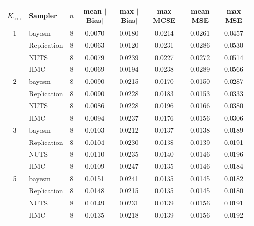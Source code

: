\begin{tabular}{clcccccc}
\toprule
$K_{\text{true}}$ & Sampler & $n$ & mean $|$Bias$|$ & max $|$Bias$|$ & max MCSE & mean MSE & max MSE \\
\midrule
1 & bayesm & 8 & 0.0070 & 0.0180 & 0.0214 & 0.0261 & 0.0457 \\
 & Replication & 8 & 0.0063 & 0.0120 & 0.0231 & 0.0286 & 0.0530 \\
 & NUTS & 8 & 0.0079 & 0.0239 & 0.0227 & 0.0272 & 0.0514 \\
 & HMC & 8 & 0.0069 & 0.0194 & 0.0238 & 0.0289 & 0.0566 \\
2 & bayesm & 8 & 0.0090 & 0.0215 & 0.0170 & 0.0150 & 0.0287 \\
 & Replication & 8 & 0.0090 & 0.0228 & 0.0183 & 0.0153 & 0.0333 \\
 & NUTS & 8 & 0.0086 & 0.0228 & 0.0196 & 0.0166 & 0.0380 \\
 & HMC & 8 & 0.0094 & 0.0237 & 0.0176 & 0.0156 & 0.0306 \\
3 & bayesm & 8 & 0.0103 & 0.0212 & 0.0137 & 0.0138 & 0.0189 \\
 & Replication & 8 & 0.0104 & 0.0230 & 0.0138 & 0.0139 & 0.0191 \\
 & NUTS & 8 & 0.0110 & 0.0235 & 0.0140 & 0.0146 & 0.0196 \\
 & HMC & 8 & 0.0109 & 0.0247 & 0.0135 & 0.0146 & 0.0184 \\
5 & bayesm & 8 & 0.0151 & 0.0241 & 0.0135 & 0.0145 & 0.0182 \\
 & Replication & 8 & 0.0148 & 0.0215 & 0.0135 & 0.0145 & 0.0180 \\
 & NUTS & 8 & 0.0149 & 0.0231 & 0.0139 & 0.0156 & 0.0191 \\
 & HMC & 8 & 0.0135 & 0.0218 & 0.0139 & 0.0156 & 0.0192 \\
\bottomrule
\end{tabular}
